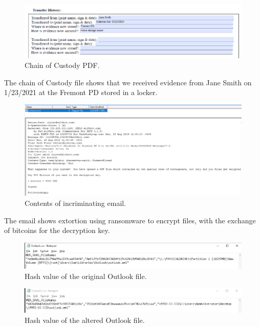 \begin{figure}[H]
    \centering
    \includegraphics[width=\linewidth]{figures/Chain of Custody.png}
    \caption{Chain of Custody PDF.}
    \label{fig:coc}
\end{figure}
The chain of Custody file shows that we received evidence from Jane Smith on 1/23/2021 at the Fremont PD stored in a locker.

\begin{figure}[H]
    \centering
    \includegraphics[width=\linewidth]{figures/outlook.eml.png}
    \caption{Contents of incriminating email.}
    \label{fig:email}
\end{figure}
The email shows extortion using ransomware to encrypt files, with the exchange of bitcoins for the decryption key.

\begin{figure}[H]
    \centering
    \includegraphics[width=\linewidth]{figures/outlook.csv.png}
    \caption{Hash value of the original Outlook file.}
    \label{fig:oHash}
\end{figure}

\begin{figure}[H]
    \centering
    \includegraphics[width=\linewidth]{figures/outlook2.csv.png}
    \caption{Hash value of the altered Outlook file.}
    \label{fig:aHash}
\end{figure}

